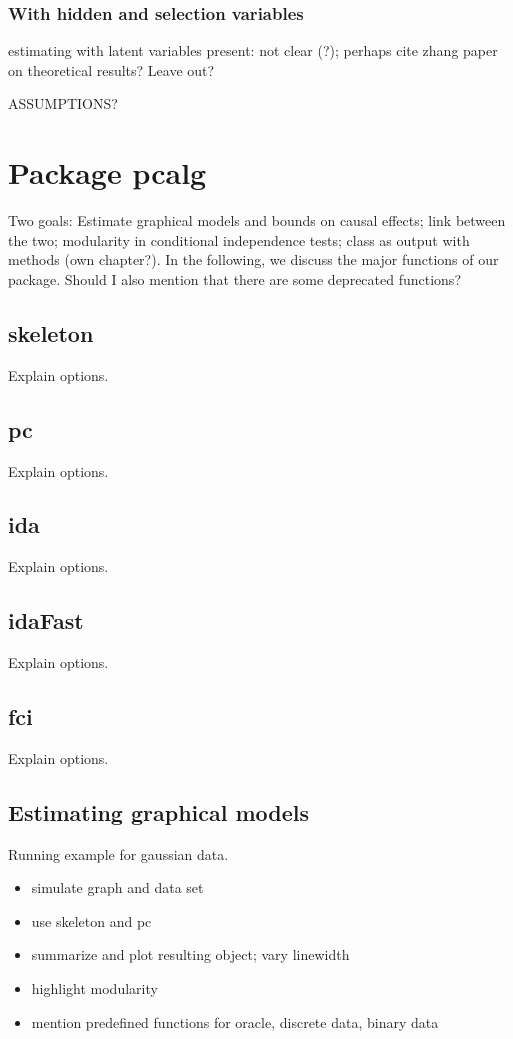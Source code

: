\documentclass[article]{jss}
\begin{document}
\subsubsection{With hidden and selection variables}
estimating with latent variables present: not clear (?); perhaps cite
zhang paper on theoretical results? Leave out?

ASSUMPTIONS?

\section{Package pcalg}
Two goals: Estimate graphical models and bounds on causal effects; link
between the two; modularity in conditional independence tests; class as
output with methods (own chapter?). In the following, we discuss the major
functions of our package. Should I also mention that there are some
deprecated functions?
\subsection{skeleton}
Explain options.
\subsection{pc}
Explain options.
\subsection{ida}
Explain options.
\subsection{idaFast}
Explain options.
\subsection{fci}
Explain options.

\subsection{Estimating graphical models}
Running example for gaussian data.
\begin{itemize}
\item simulate graph and data set
\item use skeleton and pc
\item summarize and plot resulting object; vary linewidth
\item highlight modularity
\item mention predefined functions for oracle, discrete data, binary data
\end{itemize}
\end{document}
